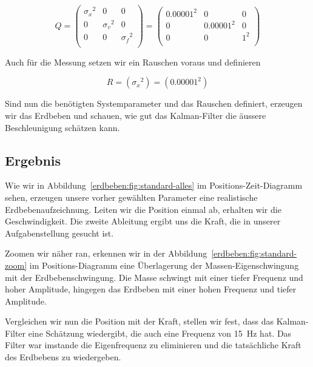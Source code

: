 \begin{equation}
	Q = \left(
	\begin{array}{ccc}
		{\sigma_x }^2& 0& 0 \\
		0 & {\sigma_v }^2& 0\\
		0 & 0& {\sigma_f }^2\\
	\end{array}\right)= \left(
	\begin{array}{ccc}
		{0.00001}^2& 0& 0 \\
		0 & {0.00001}^2& 0\\
		0 & 0& {1 }^2\\
	\end{array}\right)
\end{equation}

Auch für die Messung setzen wir ein Rauschen voraus und definieren

\begin{equation}
R= ({\sigma_x}^2)=
({0.00001}^2)
\end{equation}

Sind nun die benötigten Systemparameter und das Rauschen definiert, erzeugen wir das Erdbeben und schauen, wie gut das Kalman-Filter die äussere Beschleunigung schätzen kann.

\subsection*{Ergebnis}

Wie wir in Abbildung~\ref{erdbeben:fig:standard-alles} im Positions-Zeit-Diagramm sehen, erzeugen unsere vorher gewählten Parameter eine realistische Erdbebenaufzeichnung.
Leiten wir die Position einmal ab, erhalten wir die Geschwindigkeit.
Die zweite Ableitung ergibt uns die Kraft, die in unserer Aufgabenstellung gesucht ist.

Zoomen wir näher ran, erkennen wir in der Abbildung~\ref{erdbeben:fig:standard-zoom} im Positions-Diagramm eine Überlagerung der Massen-Eigenschwingung mit der Erdbebenschwingung.
Die Masse schwingt mit einer tiefer Frequenz und hoher Amplitude, hingegen das Erdbeben mit einer hohen Frequenz und tiefer Amplitude.

Vergleichen wir nun die Position mit der Kraft, stellen wir fest, dass das Kalman-Filter eine Schätzung wiedergibt, die auch eine Frequenz von \SI{15}{\hertz} hat.
Das Filter war imstande die Eigenfrequenz zu eliminieren und die tatsächliche Kraft des Erdbebens zu wiedergeben.

